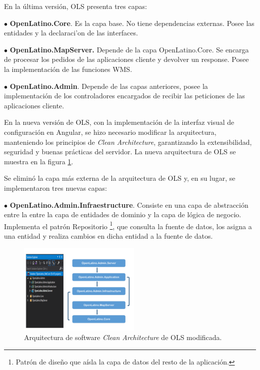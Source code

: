 En la \'ultima versi\'on, OLS presenta tres capas:

$\bullet$ \textbf{OpenLatino.Core}. Es la capa base. No tiene dependencias externas. Posee las entidades y la declaraci'on de las interfaces.

$\bullet$ \textbf{OpenLatino.MapServer.} Depende de la capa OpenLatino.Core. Se encarga de procesar los pedidos de las aplicaciones cliente y devolver un response. Posee la implementaci\'on de las funciones WMS.

$\bullet$ \textbf{OpenLatino.Admin}. Depende de las capas anteriores, posee la implementaci\'on de los controladores encargados de recibir las peticiones de las aplicaciones cliente.

En la nueva versi\'on de OLS, con la implementaci\'on de la interfaz visual de configuraci\'on en Angular, se hizo necesario modificar la arquitectura, manteniendo los principios de \textit{Clean Architecture}, garantizando la extensibilidad, seguridad y buenas pr\'acticas del servidor. La nueva arquitectura de OLS se muestra en la figura \ref{cleanArchitectureNew}.

Se elimin\'o la capa m\'as externa de la arquitectura de OLS y, en su lugar, se implementaron tres nuevas capas:

$\bullet$ \textbf{OpenLatino.Admin.Infraestructure}. Consiste en una capa de abstracci\'on entre la entre la capa de entidades de dominio y la capa de l\'ogica de negocio. Implementa el patr\'on Repositorio \footnote{Patr\'on de dise\~no que a\'isla la capa de datos del resto de la aplicaci\'on.}, que consulta la fuente de datos, los asigna a una entidad y realiza cambios en dicha entidad a la fuente de datos.

\begin{figure}
\vspace{-20pt}
\begin{center}
\includegraphics[width=0.52\textwidth]{images/cleanArchitectureNew.png} 
\end{center} \vspace{-20pt} \caption{Arquitectura de software \textit{Clean Architecture} de OLS modificada.}  \label{cleanArchitectureNew} \vspace{-10pt} 
\end{figure}

